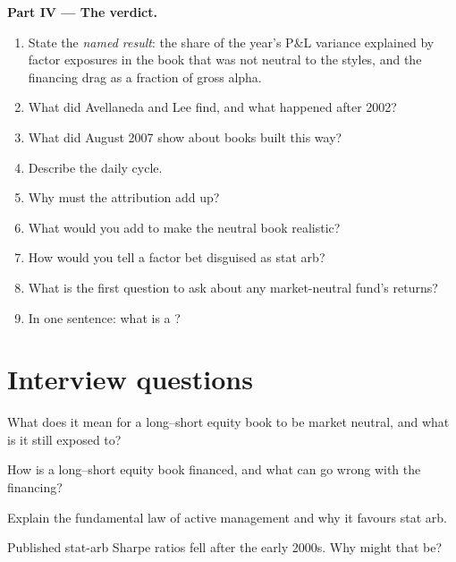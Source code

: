 \begin{problem}
\medskip\noindent\textbf{Part IV --- The verdict.}
\begin{enumerate}[resume]
\item State the \emph{named result}: the share of the year's P\&L variance explained by factor exposures in the book that was not neutral to the styles, and the
financing drag as a fraction of gross alpha.
\item What did Avellaneda and Lee find, and what happened after 2002?
\item What did August 2007 show about books built this way?
\item Describe the daily cycle.
\item Why must the attribution add up?
\item What would you add to make the neutral book realistic?
\item How would you tell a factor bet disguised as stat arb?
\item What is the first question to ask about any market-neutral fund's returns?
\item In one sentence: what is a ?
\end{enumerate}
\end{problem}

\section{Interview questions}

\begin{interviewq}\label{iq:s1:anatomy-of-a-stat-arb-book:1}
What does it mean for a long--short equity book to be market neutral, and what is it still exposed to?
\end{interviewq}

\begin{interviewq}\label{iq:s1:anatomy-of-a-stat-arb-book:2}
How is a long--short equity book financed, and what can go wrong with the financing?
\end{interviewq}

\begin{interviewq}\label{iq:s1:anatomy-of-a-stat-arb-book:3}
Explain the fundamental law of active management and why it favours stat arb.
\end{interviewq}

\begin{interviewq}\label{iq:s1:anatomy-of-a-stat-arb-book:4}
Published stat-arb Sharpe ratios fell after the early 2000s. Why might that be?
\end{interviewq}


